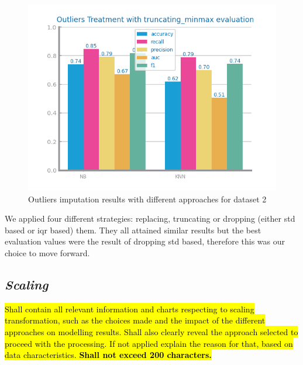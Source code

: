 \documentclass[10pt]{extarticle}
\newcommand{\ctext}[3][RGB]{%
  \begingroup
  \definecolor{hlcolor}{#1}{#2}\sethlcolor{hlcolor}%
  \hl{#3}%
  \endgroup
}
\begin{document}
\begin{figure}[H]
\includegraphics[scale=0.8]{images/dataset2/data_preparation/Credit_Score_outliers_treat_truncating_minmax.png}
\caption{Outliers imputation results with different approaches for dataset 2}
\end{figure}
We applied four different strategies: replacing, truncating or dropping (either std based or iqr based) them.
They all attained similar results but the best evaluation values were the result of dropping std based, therefore
this was our choice to move forward. 

\subsection*{\textit{Scaling}}
\ctext[RGB]{190,190,190}{Shall contain all relevant information and charts respecting to scaling transformation, such as the choices made and the impact of the different approaches on modelling results. Shall also clearly reveal the approach selected to proceed with the processing. If not applied explain the reason for that, based on data characteristics.  \textbf{Shall not exceed 200 characters.}}
\end{document}
